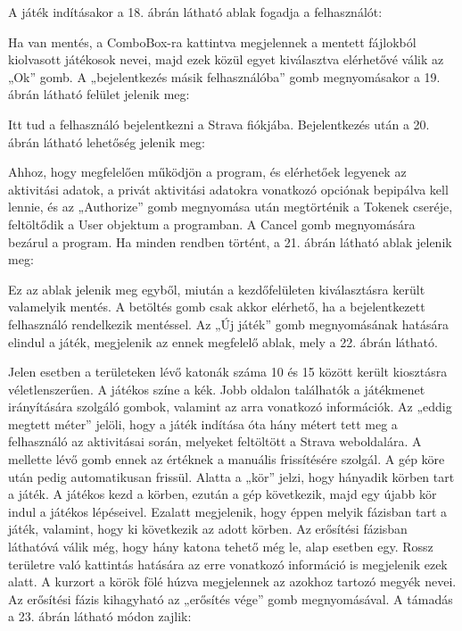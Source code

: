 A játék indításakor a 18. ábrán látható ablak fogadja a felhasználót: 




Ha van mentés, a ComboBox-ra kattintva megjelennek a mentett fájlokból kiolvasott játékosok nevei, majd ezek közül egyet kiválasztva elérhetővé válik az „Ok” gomb. A „bejelentkezés másik felhasználóba” gomb megnyomásakor a 19. ábrán látható felület jelenik meg: 



Itt tud a felhasználó bejelentkezni a Strava fiókjába. Bejelentkezés után a 20. ábrán látható lehetőség jelenik meg: 




Ahhoz, hogy megfelelően működjön a program, és elérhetőek legyenek az aktivitási adatok, a privát aktivitási adatokra vonatkozó opciónak bepipálva kell lennie, és az „Authorize” gomb megnyomása után megtörténik a Tokenek cseréje, feltöltődik a User objektum a programban. A Cancel gomb megnyomására bezárul a program. Ha minden rendben történt, a 21. ábrán látható ablak jelenik meg: 



Ez az ablak jelenik meg egyből, miután a kezdőfelületen kiválasztásra került valamelyik mentés. A betöltés gomb csak akkor elérhető, ha a bejelentkezett felhasználó rendelkezik mentéssel. Az „Új játék” gomb megnyomásának hatására elindul a játék, megjelenik az ennek megfelelő ablak, mely a 22. ábrán látható. 


Jelen esetben a területeken lévő katonák száma 10 és 15 között került kiosztásra véletlenszerűen. A játékos színe a kék. Jobb oldalon találhatók a játékmenet irányítására szolgáló gombok, valamint az arra vonatkozó információk. Az „eddig megtett méter” jelöli, hogy a játék indítása óta hány métert tett meg a felhasználó az aktivitásai során, melyeket feltöltött a Strava weboldalára. A mellette lévő gomb ennek az értéknek a manuális frissítésére szolgál. A gép köre után pedig automatikusan frissül. Alatta a „kör” jelzi, hogy hányadik körben tart a játék. A játékos kezd a körben, ezután a gép következik, majd egy újabb kör indul a játékos lépéseivel. Ezalatt megjelenik, hogy éppen melyik fázisban tart a játék, valamint, hogy ki következik az adott körben. Az erősítési fázisban láthatóvá válik még, hogy hány katona tehető még le, alap esetben egy. Rossz területre való kattintás hatására az erre vonatkozó információ is megjelenik ezek alatt. A kurzort a körök fölé húzva megjelennek az azokhoz tartozó megyék nevei. Az erősítési fázis kihagyható az „erősítés vége” gomb megnyomásával. A támadás a 23. ábrán látható módon zajlik: 

